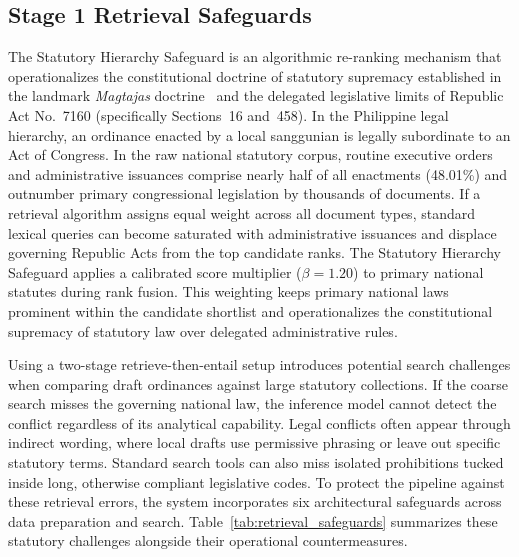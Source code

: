     \subsection{Stage 1 Retrieval Safeguards}
    \label{sec:retrieval_safeguards}
    The Statutory Hierarchy Safeguard is an algorithmic re-ranking mechanism that operationalizes the constitutional doctrine of statutory supremacy established in the landmark \textit{Magtajas} doctrine~\cite{scp1994magtajasvpryce} and the delegated legislative limits of Republic Act No.~7160 (specifically Sections~16 and~458). In the Philippine legal hierarchy, an ordinance enacted by a local sanggunian is legally subordinate to an Act of Congress. In the raw national statutory corpus, routine executive orders and administrative issuances comprise nearly half of all enactments (48.01\%) and outnumber primary congressional legislation by thousands of documents. If a retrieval algorithm assigns equal weight across all document types, standard lexical queries can become saturated with administrative issuances and displace governing Republic Acts from the top candidate ranks. The Statutory Hierarchy Safeguard applies a calibrated score multiplier ($\beta = 1.20$) to primary national statutes during rank fusion. This weighting keeps primary national laws prominent within the candidate shortlist and operationalizes the constitutional supremacy of statutory law over delegated administrative rules.

    Using a two-stage retrieve-then-entail setup introduces potential search challenges when comparing draft ordinances against large statutory collections. If the coarse search misses the governing national law, the inference model cannot detect the conflict regardless of its analytical capability. Legal conflicts often appear through indirect wording, where local drafts use permissive phrasing or leave out specific statutory terms. Standard search tools can also miss isolated prohibitions tucked inside long, otherwise compliant legislative codes. To protect the pipeline against these retrieval errors, the system incorporates six architectural safeguards across data preparation and search. Table~\ref{tab:retrieval_safeguards} summarizes these statutory challenges alongside their operational countermeasures.

